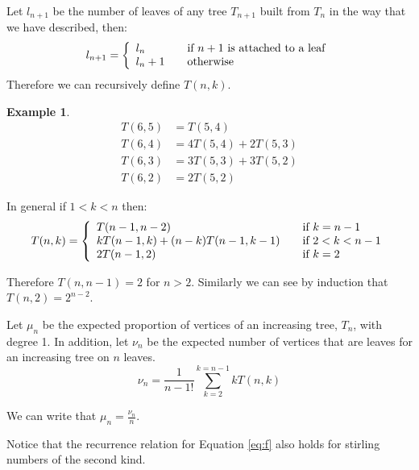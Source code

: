 \documentclass[10pt]{article} %
\theoremstyle{definition}
\newtheorem{ex}[thm]{Example}
\begin{document}
Let $l_{n+1}$ be the number of leaves of any tree $T_{n+1}$ built from $T_{n}$ in the way that we have described, then:
\[  l_{n+1} = \left\{ 
  \begin{array}{l l}
    l_{n}  & \quad \text{if $n+1$ is attached to a leaf}\\
    l_{n} + 1 & \quad \text{otherwise}
  \end{array} \right.\]
Therefore we can recursively define $T(n,k)$.
\begin{ex}
 \begin{align*}
  T(6,5) &= T(5,4) \\
  T(6,4) &= 4T(5,4) + 2T(5,3)\\
  T(6,3) &= 3T(5,3) + 3T(5,2)\\
  T(6,2) &= 2T(5,2)
 \end{align*}

\end{ex}
In general if $ 1< k< n$ then: 
\begin{equation}\label{eq:f}  
T(n,k)= \left\{ 
  \begin{array}{l l l}
    T(n-1,n-2)  & \quad \text{if   $k = n-1$}\\
    kT(n-1,k) + (n-k)T(n-1,k-1) & \quad \text{if   } 2<k<n-1 \\
    2T(n-1,2) & \quad \text{if   }k = 2
   \end{array} \right.
\end{equation}
    
Therefore $T(n,n-1 )  = 2$ for $n >2$.
Similarly we can see by induction that $T(n,2) = 2^{n-2}$.

Let $\mu_{n}$ be the expected proportion of vertices of an increasing tree, $T_{n}$, with degree 1. In addition, let $\nu_{n}$ be the expected number of vertices that are leaves for an increasing tree on $n$ leaves.  
\begin{equation}\label{eq:g}
 \nu_n  = \frac{1}{n-1!}\sum_{k=2}^{k = n-1} kT(n,k) 
\end{equation}

 
We can write that $\mu_{n} = \frac{\nu_n}{n}$.


Notice that the recurrence relation for Equation \ref{eq:f} also holds for stirling numbers of the second kind.   
\end{document}
